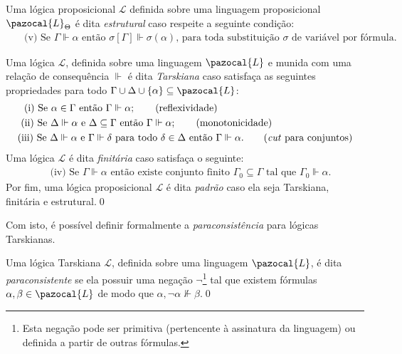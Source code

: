 \begin{definicao}
    Uma lógica proposicional $\mathcal{L}$ definida sobre uma linguagem proposicional $\pazocal{L}_{\Theta}$ é dita \textit{estrutural} caso respeite a seguinte condição:
    \begin{align*}
         & \text{~~(v) Se } \Gamma \Vdash \alpha \text{ então } \sigma [\Gamma] \Vdash \sigma(\alpha) \text{, para toda substituição } \sigma \text{ de variável por fórmula.}
    \end{align*}
\end{definicao}

\begin{definicao}
    \label{def:tarski}
    Uma lógica $\mathcal{L}$, definida sobre uma linguagem $\pazocal{L}$ e munida com uma relação de consequência $\Vdash$ é dita \textit{Tarskiana} caso satisfaça as seguintes propriedades para todo $\Gamma \cup \Delta \cup \{\alpha\} \subseteq \pazocal{L}$:
    \begin{align}
         & \text{~~(i) Se } \alpha \in \Gamma \text{ então } \Gamma \Vdash \alpha;\tag{reflexividade}                                                                                       \\
         & \text{~(ii) Se } \Delta \Vdash \alpha \text{ e } \Delta \subseteq \Gamma \text{ então } \Gamma \Vdash \alpha;\tag{monotonicidade}                                                \\
         & \text{(iii) Se } \Delta \Vdash \alpha \text{ e } \Gamma \Vdash \delta \text{ para todo } \delta \in \Delta \text{ então } \Gamma \Vdash \alpha.\tag{\textit{cut} para conjuntos}
    \end{align}
    Uma lógica $\mathcal{L}$ é dita \textit{finitária} caso satisfaça o seguinte:
    \begin{align*}
         & \text{~(iv) Se } \Gamma \Vdash \alpha \text{ então existe conjunto finito } \Gamma_{0} \subseteq \Gamma \text{ tal que } \Gamma_{0} \Vdash \alpha.
    \end{align*}
    Por fim, uma lógica proposicional $\mathcal{L}$ é dita \textit{padrão} caso ela seja Tarskiana, finitária e estrutural.\qed{}
\end{definicao}


Com isto, é possível definir formalmente a \textit{paraconsistência} para lógicas Tarskianas.

\begin{definicao}
    \label{def:tarskiana_paracons}
    Uma lógica Tarskiana $\mathcal{L}$, definida sobre uma linguagem $\pazocal{L}$, é dita \textit{paraconsistente} se ela possuir uma negação $\neg$\footnote{Esta negação pode ser primitiva (pertencente à assinatura da linguagem) ou definida a partir de outras fórmulas.} tal que existem fórmulas $\alpha, \beta \in \pazocal{L}$ de modo que $\alpha, \neg \alpha \nVdash \beta$.\qed{}
\end{definicao}

